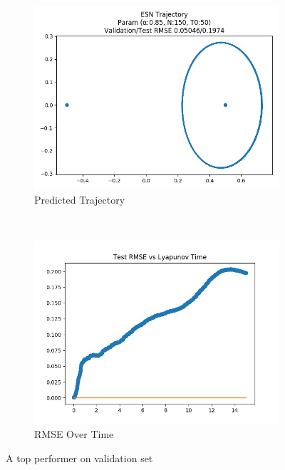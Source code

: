 \documentclass{article}
\begin{document}
\begin{figure}[H]
    \centering
    \begin{subfigure}[b]{0.45\textwidth}
        \includegraphics[width=\textwidth]{doc/paper/images/r3body/rank_1_param_366_fit.png}
        \caption{Predicted Trajectory}
    \end{subfigure}
    ~
    \begin{subfigure}[b]{0.45\textwidth}
        \includegraphics[width=\textwidth]{doc/paper/images/r3body/rank_1_param_366_rmse.png}
        \caption{RMSE Over Time}
    \end{subfigure}
    \caption{A top performer on validation set}
\end{figure}
\end{document}
